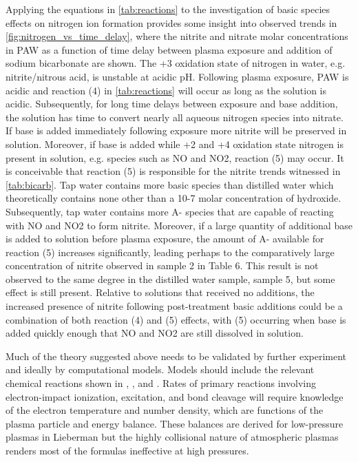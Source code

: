 Applying the equations in \cref{tab:reactions} to the investigation of basic species effects on nitrogen ion formation provides some insight into observed trends in \cref{fig:nitrogen_vs_time_delay}, where the nitrite and nitrate molar concentrations in PAW as a function of time delay between plasma exposure and addition of sodium bicarbonate are shown.  The +3 oxidation state of nitrogen in water, e.g. nitrite/nitrous acid, is unstable at acidic pH.  Following plasma exposure, PAW is acidic and reaction (4) in \cref{tab:reactions} will occur as long as the solution is acidic.  Subsequently, for long time delays between exposure and base addition, the solution has time to convert nearly all aqueous nitrogen species into nitrate.  If base is added immediately following exposure more nitrite will be preserved in solution.  Moreover, if base is added while +2 and +4 oxidation state nitrogen is present in solution, e.g. species such as NO and NO2, reaction (5) may occur.  It is conceivable that reaction (5) is responsible for the nitrite trends witnessed in \cref{tab:bicarb}.  Tap water contains more basic species than distilled water which theoretically contains none other than a 10-7 molar concentration of hydroxide.  Subsequently, tap water contains more A- species that are capable of reacting with NO and NO2 to form nitrite.  Moreover, if a large quantity of additional base is added to solution before plasma exposure, the amount of A- available for reaction (5) increases significantly, leading perhaps to the comparatively large concentration of nitrite observed in sample 2 in Table 6.  This result is not observed to the same degree in the distilled water sample, sample 5, but some effect is still present.  Relative to solutions that received no additions, the increased presence of nitrite following post-treatment basic additions could be a combination of both reaction (4) and (5) effects, with (5) occurring when base is added quickly enough that NO and NO2 are still dissolved in solution.

Much of the theory suggested above needs to be validated by further experiment and ideally by computational models.  Models should include the relevant chemical reactions shown in \cite{moussa2005acidity}, \cite{brisset2012peroxynitrite}, and \cite{greenwood1984chemistry}.  Rates of primary reactions involving electron-impact ionization, excitation, and bond cleavage will require knowledge of the electron temperature and number density, which are functions of the plasma particle and energy balance.  These balances are derived for low-pressure plasmas in Lieberman \cite{lieberman2005principles} but the highly collisional nature of atmospheric plasmas renders most of the formulas ineffective at high pressures.

